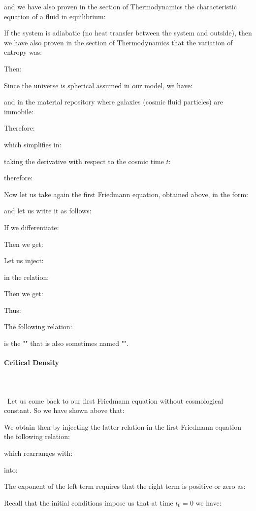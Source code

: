 	and we have also proven in the section of Thermodynamics the characteristic equation of a fluid in equilibrium:
	
	If the system is adiabatic (no heat transfer between the system and outside), then we have also proven in the section of Thermodynamics that the variation of entropy was:
	
	Then:
	
	Since the universe is spherical assumed in our model, we have:
	
	and in the material repository where galaxies (cosmic fluid particles) are immobile:
	
	Therefore:
	
	which simplifies in:
	
	taking the derivative with respect to the cosmic time $t$:
	
	therefore:
	
	Now let us take again the first Friedmann equation, obtained above, in the form:
	
	and let us write it as follows:
	
	If we differentiate:
	
	Then we get:
	
	Let us inject:
	
	in the relation:
	
	Then we get:
	
	Thus:
	
	The following relation:
	
	is the "" that is also sometimes named "".
		
	\paragraph{Critical Density}\mbox{}\\\\\
	Let us come back to our first Friedmann equation without cosmological constant. So we have shown above that:
	
	We obtain then by injecting the latter relation in the first Friedmann equation the following relation:
	
	which rearranges with:
	
	into:
	
	The exponent of the left term requires that the right term is positive or zero as:
	
	Recall that the initial conditions impose us that at time $t_0=0$ we have:
	
